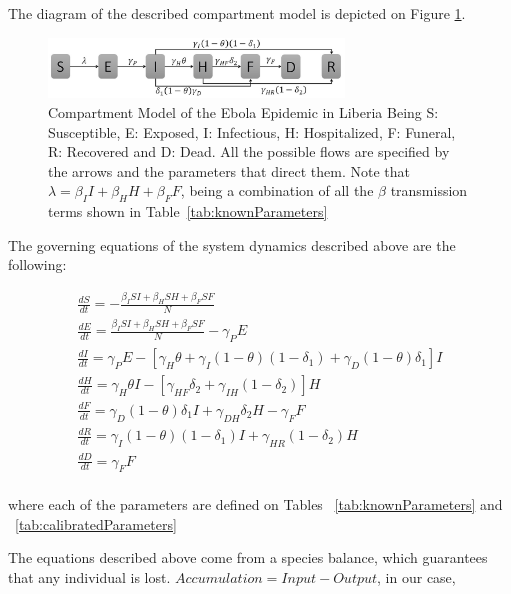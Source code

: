 The diagram of the described compartment model is depicted on Figure \ref{fig:compartment}. \\


\begin{figure}[!h]
  \centering
  \includegraphics[width=0.7\textwidth]{compartment}
  \caption{Compartment Model of the Ebola Epidemic in Liberia  \newline  Being S: Susceptible, E: Exposed, I: Infectious, H: Hospitalized, F: Funeral,  R: Recovered and D: Dead. All the possible flows are specified by the arrows and the parameters that direct them. Note that $\lambda = \beta_{I}I+\beta_{H}H+\beta_{F}F $, being a combination of all the $\beta$ transmission terms shown in Table~\ref{tab:knownParameters}} 
\label{fig:compartment} 
\end{figure}


The governing equations of the system dynamics described above are the following:

\begin{eqnarray} 
\label{SDeqn}
\frac{dS}{dt} = - \frac{\beta_{I}SI+\beta_{H}SH+\beta_{F}SF}{N} \label{eqn:SD1}\\
\frac{dE}{dt} =  \frac{\beta_{I}SI+\beta_{H}SH+\beta_{F}SF}{N}-\gamma_P E         \label{eqn:SD2}\\
\frac{dI}{dt} =  \gamma_P E - [\gamma_{H}\theta + \gamma_{I}(1-\theta)(1-\delta_{1})+\gamma_{D}(1-\theta)\delta_{1}]I   \label{eqn:SD3}\\
\frac{dH}{dt} = \gamma_{H}\theta I - [\gamma_{HF}\delta_{2}+\gamma_{IH}(1-\delta_{2})]H \label{eqn:SD4}\\
\frac{dF}{dt} = \gamma_{D}(1-\theta) \delta_{1} I + \gamma_{DH}\delta_{2} H-\gamma_{F} F      \label{eqn:SD5}\\
\frac{dR}{dt} = \gamma_{I}(1-\theta)(1- \delta_{1}) I + \gamma_{HR}(1-\delta_{2}) H\\       \label{eqn:SD6}
\frac{dD}{dt} = \gamma_{F} F     \label{eqn:SD7}
\end{eqnarray}\\

where each of the parameters are defined on Tables ~\ref{tab:knownParameters} and ~\ref{tab:calibratedParameters}



\noindent The equations described above come from a species balance, which guarantees that any individual is lost. $Accumulation = Input - Output$, in our case,


